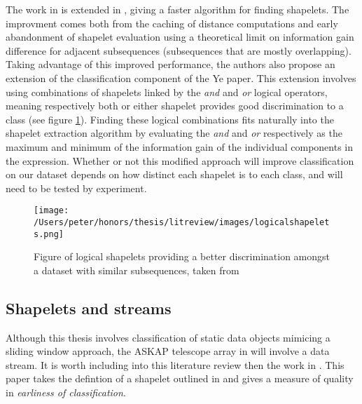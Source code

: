 	The work in \citet{ye2009time} is extended in \citet{mueen2011logical}, giving a faster algorithm for finding shapelets. The improvment comes both from the caching of distance computations and early abandonment of shapelet evaluation using a theoretical limit on information gain difference for adjacent subsequences (subsequences that are mostly overlapping). Taking advantage of this improved performance, the authors also propose an extension of the classification component of the Ye paper. This extension involves using combinations of shapelets linked by the \emph{and} and \emph{or} logical operators, meaning respectively both or either shapelet provides good discrimination to a class (see figure \ref{fig:logicalshapelets}). Finding these logical combinations fits naturally into the shapelet extraction algorithm by evaluating the \emph{and} and \emph{or} respectively as the maximum and minimum of the information gain of the individual components in the expression. Whether or not this modified approach will improve classification on our dataset depends on how distinct each shapelet is to each class, and will need to be tested by experiment.
	 
	\begin{figure}[ht!]
		\label{fig:logicalshapelets}
		\centering
		\texttt{[image: /Users/peter/honors/thesis/litreview/images/logicalshapelets.png]}
		\caption{Figure of logical shapelets providing a better discrimination amongst a dataset with similar subsequences, taken from \citet{mueen2011logical}}
	\end{figure}
	
	\subsection{Shapelets and streams}
	Although this thesis involves classification of static data objects mimicing a sliding window approach, the ASKAP telescope array in will involve a data stream. It is worth including into this literature review then the work in \citet{xing2011extracting}. This paper takes the defintion of a shapelet outlined in \citet{ye2009time} and gives a measure of quality in \emph{earliness of classification}.
	
